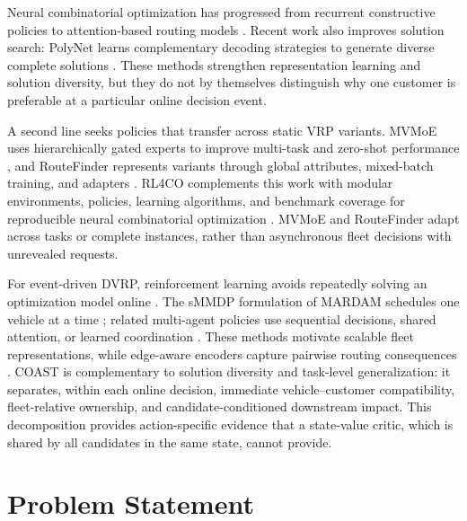 \documentclass[letterpaper]{article}
\begin{document}
Neural combinatorial optimization has progressed from recurrent constructive policies \cite{nazari2018reinforcement} to attention-based routing models \cite{kool2019attention}. Recent work also improves solution search: PolyNet learns complementary decoding strategies to generate diverse complete solutions \cite{hottung2025polynet}. These methods strengthen representation learning and solution diversity, but they do not by themselves distinguish why one customer is preferable at a particular online decision event.

A second line seeks policies that transfer across static VRP variants. MVMoE uses hierarchically gated experts to improve multi-task and zero-shot performance \cite{zhou2024mvmoe}, and RouteFinder represents variants through global attributes, mixed-batch training, and adapters \cite{berto2025routefinder}. RL4CO complements this work with modular environments, policies, learning algorithms, and benchmark coverage for reproducible neural combinatorial optimization \cite{berto2025rl4co}. MVMoE and RouteFinder adapt across tasks or complete instances, rather than asynchronous fleet decisions with unrevealed requests.

For event-driven DVRP, reinforcement learning avoids repeatedly solving an optimization model online \cite{akkerman2025comparison,konovalenko2024optimizing}. The sMMDP formulation of MARDAM schedules one vehicle at a time \cite{bono2021mardam}; related multi-agent policies use sequential decisions, shared attention, or learned coordination \cite{zhang2020multi,shahbazian2025knowledge}. These methods motivate scalable fleet representations, while edge-aware encoders capture pairwise routing consequences \cite{meng2025eformer}. COAST is complementary to solution diversity and task-level generalization: it separates, within each online decision, immediate vehicle--customer compatibility, fleet-relative ownership, and candidate-conditioned downstream impact. This decomposition provides action-specific evidence that a state-value critic, which is shared by all candidates in the same state, cannot provide.
\section{Problem Statement}
\label{sec:prob}
\end{document}
